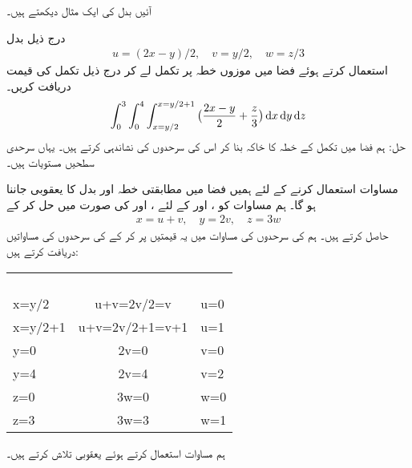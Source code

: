 آئیں بدل کی ایک مثال دیکھتے ہیں۔

درج ذیل بدل 
\begin{align}\label{مساوات_بالکثرت_کروی_بدل}
u=(2x-y)/2,\quad v=y/2,\quad w=z/3
\end{align}
 استعمال  کرتے ہوئے   فضا میں موزوں خطہ پر  تکمل لے کر درج ذیل تکمل کی قیمت دریافت کریں۔ 
\begin{align*}
\int_0^3\int_0^4\int_{x=y/2}^{x=y/2+1} \big(\frac{2x-y}{2}+\frac{z}{3}\big)\dif x\dif y\dif z
\end{align*}
حل:\quad
ہم  فضا میں تکمل کے خطہ  کا خاکہ بنا کر اس کی سرحدوں کی نشاندہی کرتے ہیں۔ یہاں سرحدی سطحیں مستویات ہیں۔

مساوات   استعمال کرنے کے لئے ہمیں    فضا میں  مطابقتی خطہ  اور بدل کا یعقوبی جاننا ہو گا۔ ہم مساوات  کو ،  اور  کے لئے ،  اور  کی صورت میں حل کر کے 
\begin{align}\label{مساوات_بالکثرت_نئے_متغیرات}
x=u+v,\quad y=2v,\quad z=3w
\end{align}
حاصل کرتے ہیں۔ ہم  کی سرحدوں کی مساوات میں  یہ قیمتیں پر کر کے   کی سرحدوں کی مساواتیں دریافت کرتے ہیں:
\begin{center}
\begin{tabular}{LCL}
\toprule
\begin{minipage}{2cm}\\   \end{minipage}&
\begin{minipage}{2cm}\\   \end{minipage}&
\begin{minipage}{2cm}\\   \end{minipage}\\
\midrule
x=y/2&u+v=2v/2=v&u=0\\
x=y/2+1&u+v=2v/2+1=v+1&u=1\\
y=0&2v=0&v=0\\
y=4&2v=4&v=2\\
z=0&3w=0&w=0\\
z=3&3w=3&w=1
\end{tabular}
\end{center}
ہم مساوات  استعمال کرتے ہوئے یعقوبی تلاش کرتے ہیں۔

